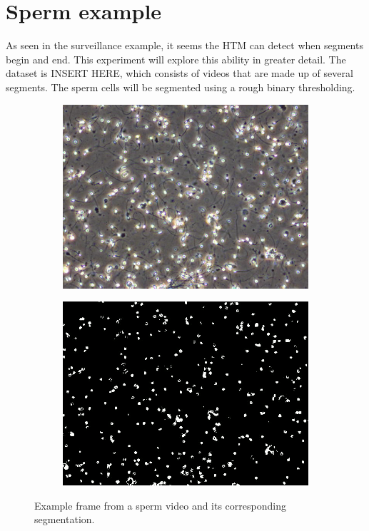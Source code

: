 \section{Sperm example}
As seen in the surveillance example, it seems the HTM can detect when segments begin and end. This experiment will explore this ability in greater detail. The dataset is INSERT HERE, which consists of videos that are made up of several segments. The sperm cells will be segmented using a rough binary thresholding.
\begin{figure}[H]
    \centering
    \begin{subfigure}[t]{0.5\textwidth}
        \centering
        \includegraphics[width=\textwidth]{resources/experiments/sperm/sperm_example.png}
    \end{subfigure}%
    \begin{subfigure}[t]{0.5\textwidth}
        \centering
        \includegraphics[width=\textwidth]{resources/experiments/sperm/sperm_seg_example.png}
    \end{subfigure}
    \caption{Example frame from a sperm video and its corresponding segmentation.}
\end{figure}

